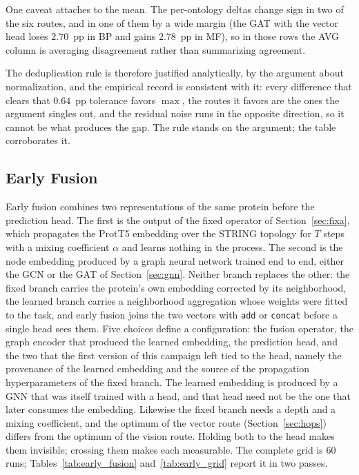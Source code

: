 \documentclass[Ingles]{ic-tese-v3}
\begin{document}
One caveat attaches to the mean. The per-ontology deltas change sign in two of the six
routes, and in one of them by a wide margin (the GAT with the vector head loses
$2.70$~pp in BP and gains $2.78$~pp in MF), so in those rows the AVG column is averaging
disagreement rather than summarizing agreement.

The deduplication rule is therefore justified analytically, by the argument about
normalization, and the empirical record is consistent with it: every difference that clears
that $0.64$~pp tolerance favors $\max$, the routes it favors are the ones the argument
singles out, and the residual noise runs in the opposite direction, so it cannot be what
produces the gap. The rule stands on the argument; the table corroborates it.

\subsection{Early Fusion}
\label{sec:early_fusion}

Early fusion combines two representations of the same protein before the prediction head.
The first is the output of the fixed operator of Section~\ref{sec:fixa}, which
propagates the ProtT5 embedding over the STRING topology for $T$ steps with a mixing
coefficient $\alpha$ and learns nothing in the process. The second is the node embedding
produced by a graph neural network trained end to end, either the GCN or the GAT of
Section~\ref{sec:gnn}. Neither branch replaces the other: the fixed branch carries the
protein's own embedding corrected by its neighborhood, the learned branch carries a
neighborhood aggregation whose weights were fitted to the task, and early fusion joins the
two vectors with \texttt{add} or \texttt{concat} before a single head sees them.
Five choices define a configuration: the fusion operator, the graph encoder that produced
the learned embedding, the prediction head, and the two that the first version of this
campaign left tied to the head, namely the provenance of the learned embedding and the
source of the propagation hyperparameters of the fixed branch.
The learned embedding is produced by a GNN that was itself trained with a head, and that
head need not be the one that later consumes the embedding. Likewise the fixed branch
needs a depth and a mixing coefficient, and the optimum of the vector route
(Section~\ref{sec:hops}) differs from the optimum of the vision route. Holding both to the
head makes them invisible; crossing them makes each measurable. The complete grid is
$60$ runs; Tables~\ref{tab:early_fusion} and~\ref{tab:early_grid} report it in two passes.
\end{document}
